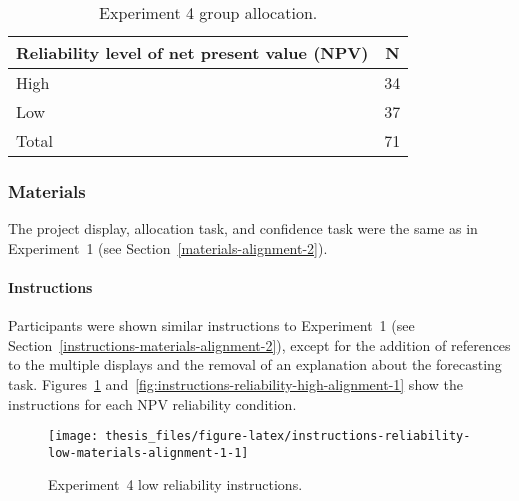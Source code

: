 \documentclass[a4paper, nobind]{templates/ociamthesis}
\theoremstyle{definition}
\theoremstyle{definition}
\theoremstyle{definition}
\theoremstyle{definition}
\theoremstyle{remark}
\begin{document}
\begin{table}[tbp]

\begin{center}
\begin{threeparttable}

\caption{\label{tab:condition-allocation-alignment-1}Experiment 4 group allocation.}

\begin{tabular}{ll}
\toprule
Reliability level of net present value (NPV) & \multicolumn{1}{c}{N}\\
\midrule
High & 34\\
Low & 37\\
Total & 71\\
\bottomrule
\end{tabular}

\end{threeparttable}
\end{center}

\end{table}

\subsubsection{Materials}

The project display, allocation task, and confidence task were the same as in
Experiment~1 (see Section~\ref{materials-alignment-2}).

\paragraph{Instructions}

Participants were shown similar instructions to Experiment~1 (see
Section~\ref{instructions-materials-alignment-2}), except for the addition of
references to the multiple displays and the removal of an explanation about the
forecasting task.
Figures~\ref{fig:instructions-reliability-low-materials-alignment-1}
and~\ref{fig:instructions-reliability-high-alignment-1} show the instructions
for each NPV reliability condition.



\begin{figure}
\texttt{[image: thesis\_files/figure-latex/instructions-reliability-low-materials-alignment-1-1]} \caption{Experiment~4 low reliability instructions.}\label{fig:instructions-reliability-low-materials-alignment-1}
\end{figure}
\end{document}

